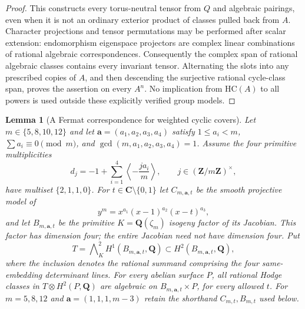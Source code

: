 \documentclass[11pt,reqno]{article}
\theoremstyle{emphasizedplain}
\newtheorem{lemma}[theorem]{Lemma}
\theoremstyle{emphasizeddefinition}
\theoremstyle{emphasizeddefinition}
\newcommand{\Q}{\mathbf Q}
\newcommand{\C}{\mathbf C}
\newcommand{\Z}{\mathbf Z}
\begin{document}
\begin{proof}
This constructs every torus-neutral tensor from $Q$ and algebraic
pairings, even when it is not an ordinary exterior product of classes
pulled back from $A$. Character projections and tensor permutations
may be performed after scalar extension: endomorphism eigenspace
projectors are complex linear combinations of rational algebraic
correspondences. Consequently the complex span of rational algebraic
classes contains every invariant tensor. Alternating the slots into
any prescribed copies of $A$, and then descending the surjective
rational cycle-class span, proves the assertion on every $A^n$.
No implication from $\mathrm{HC}(A)$ to all powers is used outside
these explicitly verified group models.
\end{proof}

\begin{lemma}[A Fermat correspondence for weighted cyclic covers]
\label{p:cyclic-transfer}
Let $m\in\{5,8,10,12\}$ and let $\boldsymbol a=(a_1,a_2,a_3,a_4)$
satisfy $1\le a_i<m$, $\sum a_i\equiv0\pmod m$, and
$\gcd(m,a_1,a_2,a_3,a_4)=1$. Assume the four primitive multiplicities
\[
 d_j=-1+\sum_{i=1}^4\left\langle-\frac{ja_i}{m}\right\rangle,
 \qquad j\in(\Z/m\Z)^\times,
\]
have multiset $\{2,1,1,0\}$. For $t\in\C\setminus\{0,1\}$ let
$C_{m,\boldsymbol a,t}$ be the smooth projective model of
\[
 y^m=x^{a_1}(x-1)^{a_2}(x-t)^{a_3},
\]
and let $B_{m,\boldsymbol a,t}$ be the primitive $K=\Q(\zeta_m)$
isogeny factor of its Jacobian. This factor has dimension four;
the entire Jacobian need not have dimension four. Put
\[
 T=\bigwedge\nolimits_K^2 H^1(B_{m,\boldsymbol a,t},\Q)
 \subset H^2(B_{m,\boldsymbol a,t},\Q),
\]
where the inclusion denotes the rational summand comprising the four
same-embedding determinant lines. For every abelian surface $P$, all
rational Hodge classes in $T\otimes H^2(P,\Q)$ are algebraic on
$B_{m,\boldsymbol a,t}\times P$, for every allowed $t$.
For $m=5,8,12$ and $\boldsymbol a=(1,1,1,m-3)$ retain the shorthand
$C_{m,t},B_{m,t}$ used below.
\end{lemma}
\end{document}
